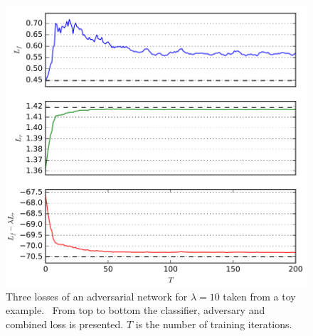 \begin{figure}[htbp]
	\centering
	\includegraphics[width=\textwidth]{figures_ML/losses_paper}
	\caption[Exemplary loss of an adversarial network structure]{Three losses of an adversarial network for $\lambda = 10$ taken from a toy example.~\cite{Louppe:2016ylz} From top to bottom the classifier, adversary and combined loss is presented. $T$ is the number of training iterations.}
	\label{fig:losses_paper}
\end{figure}


